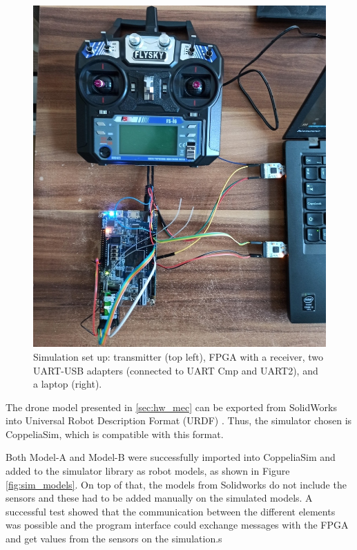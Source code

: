 \begin{figure} [H]
    \centering
    \includegraphics[scale=0.3]{Figures/simulation/simulation_setup.jpg}
    \caption{Simulation set up: transmitter (top left), FPGA with a receiver, two UART-USB adapters (connected to UART Cmp and UART2), and a laptop (right).}
    \label{fig:sim_setup}
\end{figure}

The drone model presented in \ref{sec:hw_mec} can be exported from SolidWorks into Universal Robot Description Format (URDF) \cite{bib:urdfPlugin}. Thus, the simulator chosen is CoppeliaSim, which is compatible with this format.

Both Model-A and Model-B were successfully imported into CoppeliaSim and added to the simulator library as robot models, as shown in Figure \ref{fig:sim_models}. On top of that, the models from Solidworks do not include the sensors and these had to be added manually on the simulated models. A successful test showed that the communication between the different elements was possible and the program interface could exchange messages with the FPGA and get values from the sensors on the simulation.s

